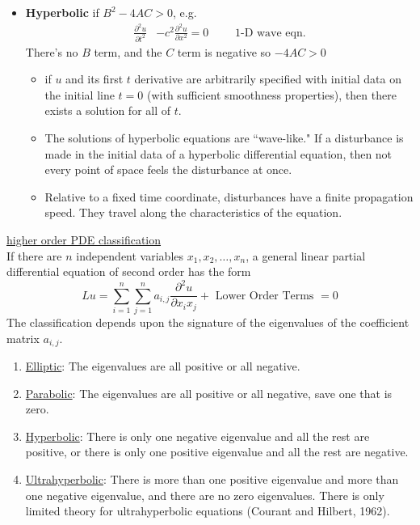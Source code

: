\documentclass[12pt]{article}
\begin{document}
\begin{itemize}
\item \textbf{Hyperbolic} if $B^2 - 4 AC > 0$, e.g.
\begin{align*}
\frac{\partial^2 u}{\partial t^2} &- c^2\frac{\partial^2 u}{\partial x^2} = 0 \qquad \text{ 1-D wave eqn.} \nonumber
\end{align*}
There's no $B$ term, and the $C$ term is negative so $-4AC > 0$
  \begin{itemize}
  \item if $u$ and its first $t$ derivative are arbitrarily specified with initial data on the initial line $t= 0$ (with sufficient smoothness properties), then there exists a solution for all of $t$.
  \item The solutions of hyperbolic equations are ``wave-like." If a disturbance is made in the initial data of a hyperbolic differential equation, then not every point of space feels the disturbance at once.
  \item Relative to a fixed time coordinate, disturbances have a finite propagation speed. They travel along the characteristics of the equation.
  \end{itemize}
 
\end{itemize}

\underline{higher order PDE classification}\\
If there are $n$ independent variables $x_1, x_2 , \dots, x_n$, a general linear partial differential equation of second order has the form
%
\begin{equation}
Lu = \sum_{i=1}^n \sum_{j=1}^n a_{i,j} \frac{\partial^2 u}{\partial x_i x_j} + \text{ Lower Order Terms } = 0 \nonumber
\end{equation}
%
The classification depends upon the signature of the eigenvalues of the coefficient matrix $a_{i,j}$.
\begin{enumerate}
\item \underline{Elliptic}: The eigenvalues are all positive or all negative.
\item \underline{Parabolic}: The eigenvalues are all positive or all negative, save one that is zero.
\item \underline{Hyperbolic}: There is only one negative eigenvalue and all the rest are positive, or there is only one positive eigenvalue and all the rest are negative.
\item \underline{Ultrahyperbolic}: There is more than one positive eigenvalue and more than one negative eigenvalue, and there are no zero eigenvalues. There is only limited theory for ultrahyperbolic equations (Courant and Hilbert, 1962).
\end{enumerate}
\end{document}
